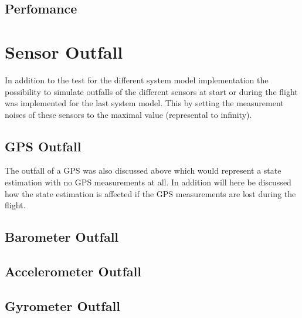 \subsection{Perfomance}


\section{Sensor Outfall}
In addition to the test for the different system model implementation
the possibility to simulate outfalls of the different sensors at start or during the flight was implemented for the last system model.
This by setting the measurement noises of these sensors to the maximal value (represental to infinity).

\subsection{GPS Outfall}
The outfall of a GPS was also discussed above which would represent a state estimation with no GPS measurements at all.
In addition will here be discussed how the state estimation is affected if the GPS measurements are lost during the flight.


\subsection{Barometer Outfall}
\subsection{Accelerometer Outfall}
\subsection{Gyrometer Outfall}